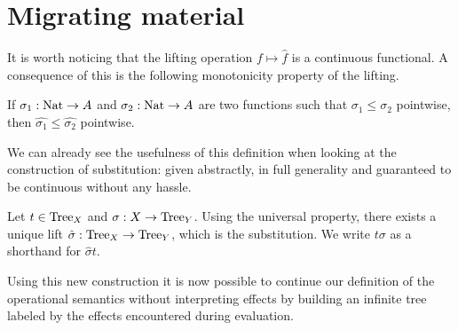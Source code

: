 \section{Migrating material}

It is worth noticing that the lifting operation $f \mapsto \hat{f}$ is
a continuous functional. A consequence of this is the following monotonicity 
property of the lifting.

\begin{alemma}
    \label{lem:orderpreservinglift}
    If $\sigma_1 : \textnormal{Nat} \to A$ and $\sigma_2 : \textnormal{Nat} \to A$ 
    are two functions such that $\sigma_1 \leq \sigma_2$ pointwise,
    then $\hat{\sigma_1} \leq \hat{\sigma_2}$ pointwise.
\end{alemma}

We can already see the usefulness of this definition 
when looking at the construction of substitution:
given abstractly, in full generality and 
guaranteed to be continuous without any hassle. 

\begin{adefinition}[Substitution]
    Let $t \in \textnormal{Tree}_X$ 
    and $\sigma : X \to \textnormal{Tree}_Y$.
    Using the universal property, there exists a
    unique lift $\hat{\sigma} : \textnormal{Tree}_X \to \textnormal{Tree}_Y$,
    which is the substitution. We write $t\sigma$ as a shorthand for 
    $\hat{\sigma}t$.
\end{adefinition}


Using this new construction it is now possible  
to continue our definition of the operational semantics without 
interpreting effects by building an infinite tree
labeled by the effects encountered during evaluation.



% 